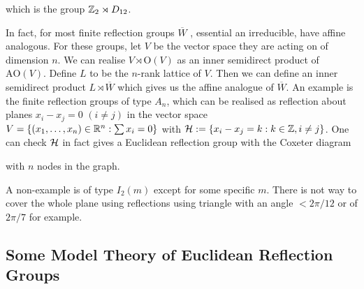 \documentclass[../main.tex]{subfiles}
\begin{document}
which is the group $\mathbb{Z}_2 \rtimes D_{12}$.

In fact, for most finite reflection groups $\overline W$ , essential an irreducible, have affine analogous. For these groups, let $V$ be the vector space they are acting on of dimension $n$. We can realise $V\rtimes\text{O}(V)$ as an inner semidirect product of $\text{AO}(V)$. Define $L$ to be the $n$-rank lattice of $V$. Then we can define an inner semidirect product $L\rtimes \overline W$ which gives us the affine analogue of $\overline W$. An example is the finite reflection groups of type $A_n$, which can be realised as reflection about planes $x_i-x_j=0$ $(i\neq j)$ in the vector space $V=\{(x_1,\dots,x_n)\in\mathbb{R}^n:\sum x_i=0\}$ with $\mathcal{H} := \{x_i-x_j=k:k\in \mathbb{Z}, i\neq j\}$. One can check $\mathcal{H}$ in fact gives a Euclidean reflection group with the Coxeter diagram


with $n$ nodes in the graph.

A non-example is of type $I_2(m)$ except for some specific $m$. There is not way to cover the whole plane using reflections using triangle with an angle $<2\pi/12$ or of $2\pi/7$ for example.

\subsection{Some Model Theory of Euclidean Reflection Groups}
\end{document}
